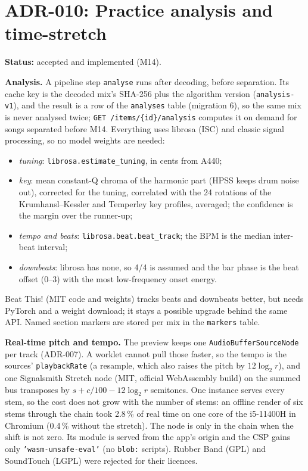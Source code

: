 \section{ADR-010: Practice analysis and time-stretch}
\textbf{Status:} accepted and implemented (M14).

\textbf{Analysis.} A pipeline step \texttt{analyse} runs after decoding, before
separation. Its cache key is the decoded mix's SHA-256 plus the algorithm
version (\texttt{analysis-v1}), and the result is a row of the
\texttt{analyses} table (migration 6), so the same mix is never analysed twice;
\texttt{GET /items/\{id\}/analysis} computes it on demand for songs separated
before M14. Everything uses librosa (ISC) and classic signal processing, so no
model weights are needed:
\begin{itemize}
  \item \emph{tuning}: \texttt{librosa.estimate\_tuning}, in cents from A440;
  \item \emph{key}: mean constant-Q chroma of the harmonic part (HPSS keeps drum
  noise out), corrected for the tuning, correlated with the 24 rotations of the
  Krumhansl--Kessler and Temperley key profiles, averaged; the confidence is
  the margin over the runner-up;
  \item \emph{tempo and beats}: \texttt{librosa.beat.beat\_track}; the BPM is
  the median inter-beat interval;
  \item \emph{downbeats}: librosa has none, so 4/4 is assumed and the bar phase
  is the beat offset (0--3) with the most low-frequency onset energy.
\end{itemize}
Beat This! (MIT code and weights) tracks beats and downbeats better, but needs
PyTorch and a weight download; it stays a possible upgrade behind the same
API. Named section markers are stored per mix in the \texttt{markers} table.

\textbf{Real-time pitch and tempo.} The preview keeps one
\texttt{AudioBufferSourceNode} per track (ADR-007). A worklet cannot pull those
faster, so the tempo is the sources' \texttt{playbackRate} (a resample, which
also raises the pitch by $12\log_2 r$), and one Signalsmith Stretch node (MIT,
official WebAssembly build) on the summed bus transposes by
$s + c/100 - 12\log_2 r$ semitones. One instance serves every stem, so the cost
does not grow with the number of stems: an offline render of six stems through
the chain took 2.8\,\% of real time on one core of the i5-11400H in Chromium
(0.4\,\% without the stretch). The node is only in the chain when the shift is
not zero. Its module is served from the app's origin and the CSP gains only
\texttt{'wasm-unsafe-eval'} (no \texttt{blob:} scripts). Rubber Band (GPL) and
SoundTouch (LGPL) were rejected for their licences.

